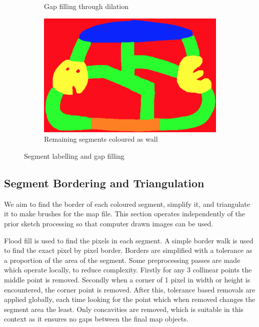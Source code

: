 \documentclass[11pt]{IEEEtran}
\begin{document}
\begin{figure}[h]
\begin{subfigure}[b]{0.24\textwidth}
         \caption{Gap filling through dilation}
         \label{fig:l3}
     \end{subfigure}
     \hfill
     \begin{subfigure}[b]{0.24\textwidth}
         \centering
         \includegraphics[width=\textwidth]{l4}
         \caption{Remaining segments coloured as wall}
         \label{fig:l4}
     \end{subfigure}
        \caption{Segment labelling and gap filling}
        \label{fig:labelling}
\end{figure}

\subsection{Segment Bordering and Triangulation}

We aim to find the border of each coloured segment, simplify it, and triangulate it to make brushes for the map file. This section operates independently of the prior sketch processing so that computer drawn images can be used.

Flood fill is used to find the pixels in each segment. A simple border walk is used to find the exact pixel by pixel border. Borders are simplified with a tolerance as a proportion of the area of the segment. Some preprocessing passes are made which operate locally, to reduce complexity. Firstly for any 3 collinear points the middle point is removed. Secondly when a corner of 1 pixel in width or height is encountered, the corner point is removed. After this, tolerance based removals are applied globally, each time looking for the point which when removed changes the segment area the least. Only concavities are removed, which is suitable in this context as it ensures no gaps between the final map objects.
\end{document}
